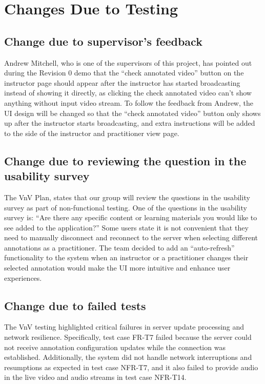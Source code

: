 \documentclass[12pt, titlepage]{article}
\begin{document}
\section{Changes Due to Testing}

\subsection{Change due to supervisor's feedback}
Andrew Mitchell, who is one of the supervisors of this project, has pointed out during the Revision 0 demo that the “check annotated video” button on the instructor page should appear after the instructor has started broadcasting instead of showing it directly, as clicking the check annotated video can’t show anything without input video stream. To follow the feedback from Andrew, the UI design will be changed so that the “check annotated video” button only shows up after the instructor starts broadcasting, and extra instructions will be added to the side of the instructor and practitioner view page.

\subsection{Change due to reviewing the question in the usability survey}
The VnV Plan, states that our group will review the questions in the usability survey as part of non-functional testing. One of the questions in the usability survey is: “Are there any specific content or learning materials you would like to see added to the application?” Some users state it is not convenient that they need to manually disconnect and reconnect to the server when selecting different annotations as a practitioner. The team decided to add an “auto-refresh” functionality to the system when an instructor or a practitioner changes their selected annotation would make the UI more intuitive and enhance user experiences.

\subsection{Change due to failed tests}
The VnV testing highlighted critical failures in server update processing and network resilience. Specifically, test case FR-T7 failed because the server could not receive annotation configuration updates while the connection was established. Additionally, the system did not handle network interruptions and resumptions as expected in test case NFR-T7, and it also failed to provide audio in the live video and audio streams in test case NFR-T14.
\end{document}
